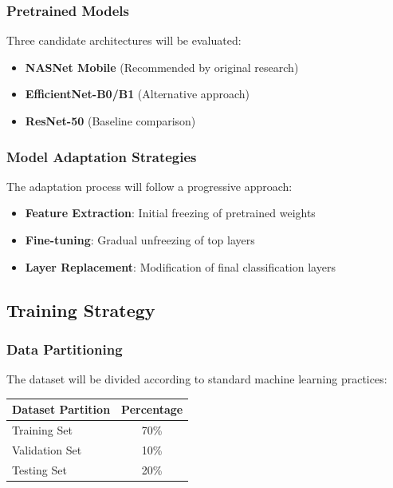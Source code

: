 \documentclass[12pt]{article}
\begin{document}
\qquad {} \rightarrow {} \rightarrow {}

\subsubsection{Pretrained Models}
Three candidate architectures will be evaluated:

\begin{itemize}
    \item \textbf{NASNet Mobile} (Recommended by original research)
    \item \textbf{EfficientNet-B0/B1} (Alternative approach)
    \item \textbf{ResNet-50} (Baseline comparison)
\end{itemize}

\subsubsection{Model Adaptation Strategies}
The adaptation process will follow a progressive approach:

\begin{itemize}
    \item \textbf{Feature Extraction}: Initial freezing of pretrained weights
    \item \textbf{Fine-tuning}: Gradual unfreezing of top layers
    \item \textbf{Layer Replacement}: Modification of final classification layers
\end{itemize}

\subsection{Training Strategy}

\subsubsection{Data Partitioning}
The dataset will be divided according to standard machine learning practices:

\begin{table}[H]
\centering
\begin{tabular}{@{}lc@{}}
\toprule
\textbf{Dataset Partition} & \textbf{Percentage} \\
\midrule
Training Set & 70\% \\
Validation Set & 10\% \\
Testing Set & 20\% \\
\bottomrule
\end{tabular}
\end{table}
\end{document}
